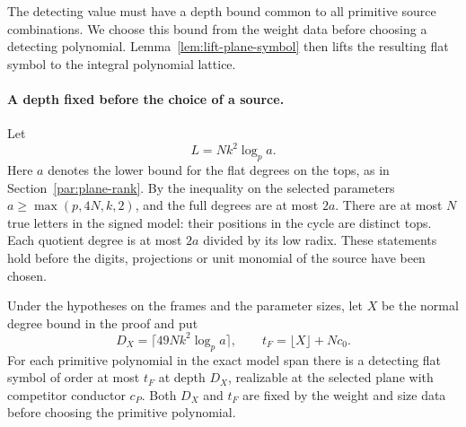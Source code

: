 The detecting value must have a depth bound common to all
primitive source combinations. We choose this bound from the
weight data before choosing a detecting polynomial. Lemma~\ref{lem:lift-plane-symbol}
then lifts the resulting flat symbol to the integral polynomial lattice.
\paragraph{A depth fixed before the choice of a source.}
\label{par:plane-uniform}
\hypertarget{source-plane-return}{}
Let
\[
 L=Nk^2\log_p a.
\]
Here \(a\) denotes the lower bound for
the flat degrees on the tops, as in Section~\ref{par:plane-rank}.
By the inequality on the selected parameters \(a\ge\max(p,4N,k,2)\), and the full
degrees are at most \(2a\). There are at most \(N\) true letters
in the signed model: their positions in the cycle are distinct tops.
Each quotient degree is at most \(2a\) divided by its low radix.
These statements hold before the digits, projections or unit
monomial of the source have been chosen.

\begin{proposition}\label{prop:plane-uniform-symbol-return}
Under the hypotheses on the frames and the parameter sizes, let \(X\) be the normal degree bound in the proof and put
\[
 D_X=\lceil49Nk^2\log_p a\rceil,\qquad t_F=\lfloor X\rfloor+Nc_0.
\]
 For each primitive polynomial
in the exact model span there is a detecting flat symbol
of order at most \(t_F\) at depth \(D_X\), realizable
at the selected plane with competitor conductor \(c_P\).
Both \(D_X\) and \(t_F\) are fixed by the weight and size
data before choosing the primitive polynomial.
\end{proposition}

